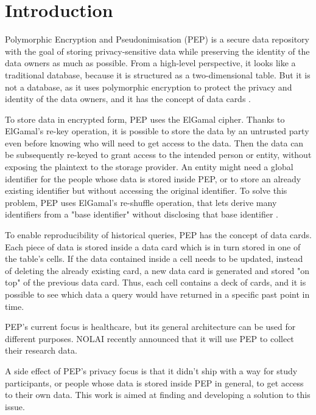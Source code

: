 \documentclass{report}
\begin{document}
\section{Introduction}
Polymorphic Encryption and Pseudonimisation (PEP) is a secure data repository with the goal of storing privacy-sensitive data while preserving the identity of the data owners as
much as possible. From a high-level perspective, it looks like a traditional database, because it is structured as a two-dimensional table. But it is not a database, as it
uses polymorphic encryption to protect the privacy and identity of the data owners, and it has the concept of data cards \cite{pep-blueprint}.\par
To store data in encrypted form, PEP uses the ElGamal cipher. Thanks to ElGamal's re-key operation, it is possible to store the data by an untrusted party even before knowing who
will need to get access to the data. Then the data can be subsequently re-keyed to grant access to the intended person or entity, without exposing the plaintext to the storage provider.
An entity might need a global identifier for the people whose data is stored inside PEP, or to store an already existing identifier but without accessing the original identifier. To
solve this problem, PEP uses ElGamal's re-shuffle operation, that lets derive many identifiers from a "base identifier" without disclosing that base identifier \cite{peppaper}.\par
To enable reproducibility of historical queries, PEP has the concept of data cards. Each piece of data is stored inside a data card which is in turn stored in one of the table's
cells. If the data contained inside a cell needs to be updated, instead of deleting the already existing card, a new data card is generated and stored "on top" of the previous data
card. Thus, each cell contains a deck of cards, and it is possible to see which data a query would have returned in a specific past point in time. \par
PEP's current focus is healthcare, but its general architecture can be used for different purposes. NOLAI \cite{nolai} \cite{pepproject} recently announced that it will use PEP to
collect their research data. \par
A side effect of PEP's privacy focus is that it didn't ship with a way for study participants, or people whose data is stored inside PEP in general, to get access to their own data.
This work is aimed at finding and developing a solution to this issue.
\end{document}
